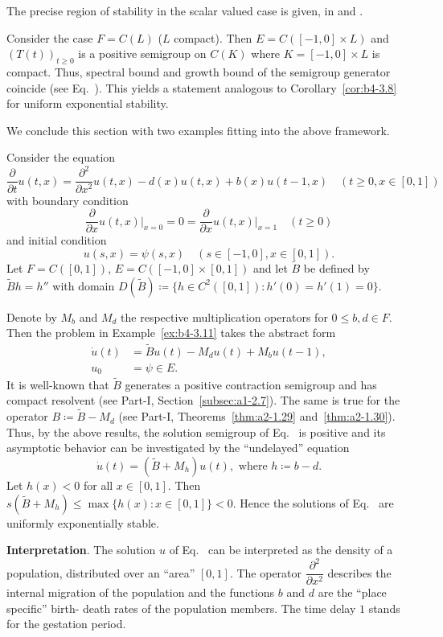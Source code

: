 The precise region of stability in the scalar valued case is given, \eg in \textcite{hadeler:1978}  and  \textcite[p.107ff]{hale:1977}.

\begin{remark*}
	Consider the case $F = C(L)$ ($L$ compact).
	Then $E = C([-1,0] \times L)$ and $(T(t))_{t\geq0}$ is a positive semigroup on $C(K)$ where $K = [-1,0] \times L$ is compact. 
	Thus, spectral bound and growth bound of the semigroup generator coincide (see Eq.~). 
	This yields a statement analogous to Corollary~\ref{cor:b4-3.8} for uniform exponential stability.
\end{remark*}
We conclude this section with two examples fitting into the above framework.
\begin{example}\label{ex:b4-3.11}
	Consider the equation
\[
    \frac{\partial}{\partial t}u(t,x) = 
    \frac{\partial^2}{\partial x^2}u(t,x) - d(x)u(t,x) + b(x)u(t-1,x) \quad (t\geq0,x\in[0,1])
\]
with boundary condition
\begin{equation}\label{eq:b4-3.11}
    \frac{\partial}{\partial x}u(t,x)\big|_{x=0} = 0 = \frac{\partial}{\partial x}u(t,x)\big|_{x=1} \quad (t\geq0)
\end{equation}
and initial condition
\[
	u(s,x) = \psi(s,x) \quad (s\in[-1,0],x\in[0,1]) .
\]
Let $F = C([0,1])$, $E = C([-1,0] \times [0,1] )$ and let $\tilde{B}$ be defined by $\tilde{B}h = h''$ with domain $D(\tilde{B}) \coloneq  \{h \in C^2([0,1]) \colon h'(0) = h'(1) = 0\}$.

Denote by $M_b$ and $M_d$ the respective multiplication operators for $0 \leq b,d \in F$. 
Then the problem in Example~\ref{ex:b4-3.11} takes the abstract form
\begin{align*}
	\dot{u}(t) &= \tilde{B}u(t) - M_du(t) + M_bu(t-1) ,\\
	u_0 &= \psi \in E .
\end{align*}
It is well-known that $\tilde{B}$ generates a positive contraction semigroup and has compact resolvent (see Part-I, Section~\ref{subsec:a1-2.7}). 
The same is true for the operator $B  \coloneq  \tilde{B} - M_d$ (see Part-I, Theorems~\ref{thm:a2-1.29} and~\ref{thm:a2-1.30}). 
Thus, by the above results, the solution semigroup of Eq.~ is positive and its asymptotic behavior can be investigated by the \enquote{undelayed} equation
\[
\dot{u}(t) = (\tilde{B} + M_h)u(t) , \text{ where } h \coloneq  b - d .
\]
Let $h(x) < 0$ for all $x \in [0,1]$.
Then $s(\tilde{B} + M_h) \leq \max\{h(x) \colon x \in [0,1]\} < 0$. 
Hence the solutions of Eq.~ are uniformly exponentially stable.
\end{example}
\textbf{Interpretation}.\quad
	The solution $u$ of Eq.~ can be interpreted as the density of a population, distributed over an \enquote{area} $[0,1]$.
	The operator $\dfrac{\partial^2}{\partial x^2}$ describes the internal migration of the population and the functions $b$ and $d$ are the \enquote{place specific} birth- \resp death rates of the population members. 
	The time delay $1$ stands for the gestation period. 
	
